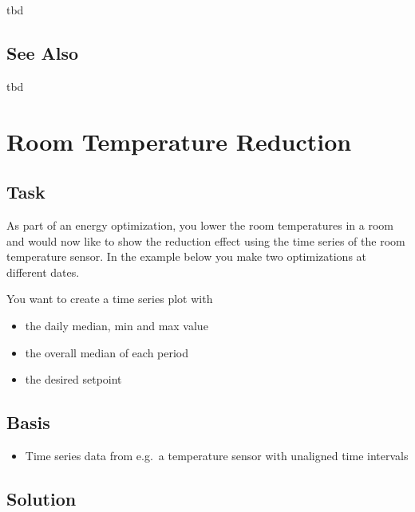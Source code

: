 \documentclass[
]{book}
\providecommand{\tightlist}{%
  \setlength{\itemsep}{0pt}\setlength{\parskip}{0pt}}
\begin{document}
tbd

\hypertarget{see-also-3}{%
\subsection{See Also}\label{see-also-3}}

tbd

\hypertarget{room-temperature-reduction}{%
\section{Room Temperature Reduction}\label{room-temperature-reduction}}

\hypertarget{task-4}{%
\subsection{Task}\label{task-4}}

As part of an energy optimization, you lower the room temperatures in a room and would now like to show the reduction effect using the time series of the room temperature sensor. In the example below you make two optimizations at different dates.

You want to create a time series plot with

\begin{itemize}
\item
  the daily median, min and max value
\item
  the overall median of each period
\item
  the desired setpoint
\end{itemize}

\hypertarget{basis-5}{%
\subsection{Basis}\label{basis-5}}

\begin{itemize}
\tightlist
\item
  Time series data from e.g.~a temperature sensor with unaligned time intervals
\end{itemize}

\hypertarget{solution-9}{%
\subsection{Solution}\label{solution-9}}
\end{document}
